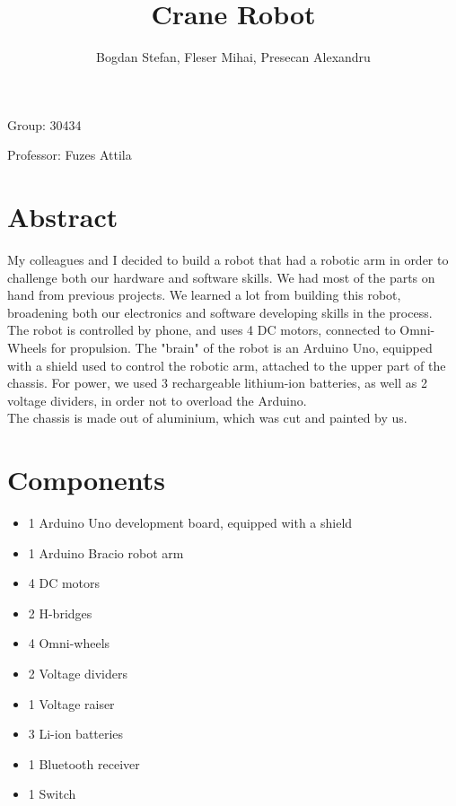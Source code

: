 \documentclass{article}
\title{Crane Robot}
\author{Bogdan Stefan, Fleser Mihai, Presecan Alexandru}
\begin{document}
	\maketitle
	\vspace*{\fill}
	Group: 30434 \par
	Professor: Fuzes Attila
	\newpage
	
	\tableofcontents
	\newpage
	
	\section{Abstract}
	
	My colleagues and I decided to build a robot that had a robotic arm in order to challenge both our hardware and software skills. We had most of the parts on hand from previous projects. We learned a lot from building this robot, broadening both our electronics and software developing skills in the process. \\
	
	The robot is controlled by phone, and uses 4 DC motors, connected to Omni-Wheels for propulsion. The "brain" of the robot is an Arduino Uno, equipped with a shield used to control the robotic arm, attached to the upper part of the chassis. For power, we used 3 rechargeable lithium-ion batteries, as well as 2 voltage dividers, in order not to overload the Arduino. \\
	
	The chassis is made out of aluminium, which was cut and painted by us.
	
	\section{Components}
	
	\begin{itemize}
		\item 1 Arduino Uno development board, equipped with a shield
		\item 1 Arduino Bracio robot arm
		\item 4 DC motors
		\item 2 H-bridges
		\item 4 Omni-wheels
		\item 2 Voltage dividers
		\item 1 Voltage raiser
		\item 3 Li-ion batteries
		\item 1 Bluetooth receiver
		\item 1 Switch
		
	\end{itemize}
	
\end{document}
